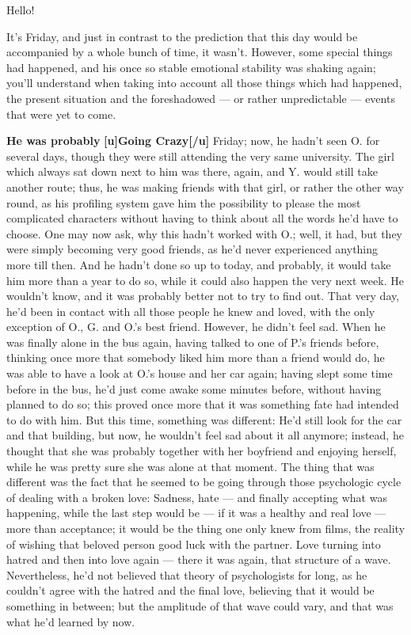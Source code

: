 Hello!

It's Friday, and just in contrast to the prediction that this day would be accompanied by a whole bunch of time, it wasn't. However, some special things had happened, and his once so stable emotional stability was shaking again; you'll understand when taking into account all those things which had happened, the present situation and the foreshadowed --- or rather unpredictable --- events that were yet to come. 

\textbf{He was probably}
\textbf{[u]Going Crazy[/u]}
Friday; now, he hadn't seen O. for several days, though they were still attending the very same university. The girl which always sat down next to him was there, again, and Y. would still take another route; thus, he was making friends with that girl, or rather the other way round, as his profiling system gave him the possibility to please the most complicated characters without having to think about all the words he'd have to choose. One may now ask, why this hadn't worked with O.; well, it had, but they were simply becoming very good friends, as he'd never experienced anything more till then. 
And he hadn't done so up to today, and probably, it would take him more than a year to do so, while it could also happen the very next week. He wouldn't know, and it was probably better not to try to find out. 
That very day, he'd been in contact with all those people he knew and loved, with the only exception of O., G. and O.'s best friend. However, he didn't feel sad. When he was finally alone in the bus again, having talked to one of P.'s friends before, thinking once more that somebody liked him more than a friend would do, he was able to have a look at O.'s house and her car again; having slept some time before in the bus, he'd just come awake some minutes before, without having planned to do so; this proved once more that it was something fate had intended to do with him. But this time, something was different: He'd still look for the car and that building, but now, he wouldn't feel sad about it all anymore; instead, he thought that she was probably together with her boyfriend and enjoying herself, while he was pretty sure she was alone at that moment. The thing that was different was the fact that he seemed to be going through those psychologic cycle of dealing with a broken love: Sadness, hate --- and finally accepting what was happening, while the last step would be --- if it was a healthy and real love --- more than acceptance; it would be the thing one only knew from films, the reality of wishing that beloved person good luck with the partner. Love turning into hatred and then into love again --- there it was again, that structure of a wave. Nevertheless, he'd not believed that theory of psychologists for long, as he couldn't agree with the hatred and the final love, believing that it would be something in between; but the amplitude of that wave could vary, and that was what he'd learned by now. 
